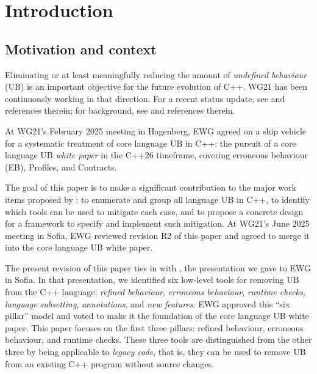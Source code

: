 

\section{Introduction}
\label{intro}

\subsection{Motivation and context}

Eliminating or at least meaningfully reducing the amount of \emph{undefined behaviour} (UB) is an important objective for the future evolution of C++. WG21 has been continuously working in that direction. For a recent status update, see \cite{Sutter2025} and references therein; for background, see \cite{Sutter2024} and references therein.

At WG21's February 2025 meeting in Hagenberg, EWG agreed on a ship vehicle for a systematic
treatment of core language UB in C++: the pursuit of a core language UB \emph{white paper} \cite{P3656R1} in the C++26 timeframe, covering erroneous behaviour (EB), Profiles, and Contracts.

The goal of this paper is to make a significant contribution to the major work items proposed by \cite{P3656R1}:  to enumerate and group all language UB in C++, to identify which tools can be used to mitigate each case, and to propose a concrete design for a framework to specify and implement such mitigation. At WG21's June 2025 meeting in Sofia, EWG reviewed revision R2 of this paper and agreed to merge it into the core language UB white paper.

The present revision of this paper ties in with \cite{P3754R0}, the presentation we gave to EWG in Sofia. In that presentation, we identified six low-level tools for removing UB from the C++ language: \emph{refined behaviour}, \emph{erroneous behaviour}, \emph{runtime checks}, \emph{language subsetting}, \emph{annotations}, and \emph{new features}. EWG approved this ``six pillar'' model and voted to make it the foundation of the core language UB white paper. This paper focuses on the first three pillars: refined behaviour, erroneous behaviour, and runtime checks. These three tools are distinguished from the other three by being applicable to \emph{legacy code}, that is, they can be used to remove UB from an existing C++ program without source changes. 

